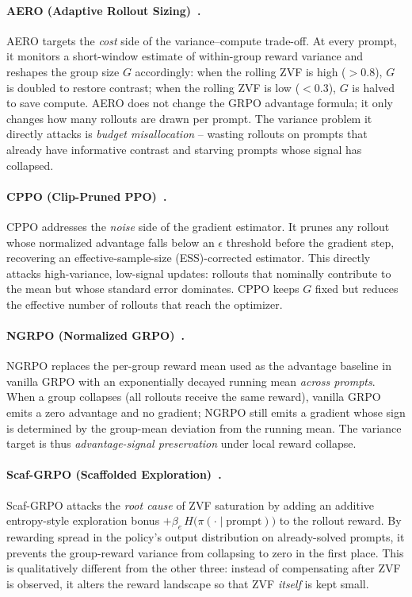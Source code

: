 \paragraph{AERO (Adaptive Rollout Sizing)~\cite{aero2024}.}
AERO targets the \emph{cost} side of the variance--compute trade-off.
At every prompt, it monitors a short-window estimate of within-group
reward variance and reshapes the group size $G$ accordingly: when the
rolling ZVF is high (\(>0.8\)), $G$ is doubled to restore contrast;
when the rolling ZVF is low (\(<0.3\)), $G$ is halved to save compute.
AERO does not change the GRPO advantage formula; it only changes how
many rollouts are drawn per prompt. The variance problem it directly
attacks is \emph{budget misallocation} -- wasting rollouts on prompts
that already have informative contrast and starving prompts whose
signal has collapsed.

\paragraph{CPPO (Clip-Pruned PPO)~\cite{cppo2024}.}
CPPO addresses the \emph{noise} side of the gradient estimator. It
prunes any rollout whose normalized advantage falls below an
$\epsilon$ threshold before the gradient step, recovering an
effective-sample-size (ESS)-corrected estimator. This directly
attacks high-variance, low-signal updates: rollouts that nominally
contribute to the mean but whose standard error dominates. CPPO keeps
$G$ fixed but reduces the effective number of rollouts that reach the
optimizer.

\paragraph{NGRPO (Normalized GRPO)~\cite{ngrpo2025}.}
NGRPO replaces the per-group reward mean used as the advantage
baseline in vanilla GRPO with an exponentially decayed running mean
\emph{across prompts}. When a group collapses (all rollouts receive
the same reward), vanilla GRPO emits a zero advantage and no gradient;
NGRPO still emits a gradient whose sign is determined by the
group-mean deviation from the running mean. The variance target is
thus \emph{advantage-signal preservation} under local reward
collapse.

\paragraph{Scaf-GRPO (Scaffolded Exploration)~\cite{scafgrpo2025}.}
Scaf-GRPO attacks the \emph{root cause} of ZVF saturation by adding
an additive entropy-style exploration bonus
\(+\beta_e\,H\!\big(\pi(\cdot\mid \text{prompt})\big)\) to the rollout
reward. By rewarding spread in the policy's output distribution on
already-solved prompts, it prevents the group-reward variance from
collapsing to zero in the first place. This is qualitatively
different from the other three: instead of compensating after ZVF is
observed, it alters the reward landscape so that ZVF \emph{itself} is
kept small.

